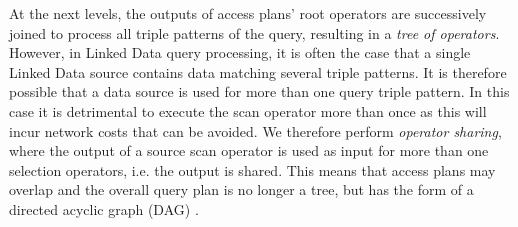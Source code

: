 At the next levels, the outputs of access plans' root operators are successively
joined to process all triple patterns of the query, resulting in a \emph{tree of operators}. However, in Linked Data query processing, it is often the case that a single
Linked Data source contains data matching several triple patterns. It
is therefore possible that a data source is used for more than one
query triple pattern. In this case it is detrimental to execute the
scan operator more than once as this will incur network costs that can
be avoided. We therefore perform \emph{operator sharing}, where the
output of a source scan operator is used as input for more than one
selection operators, i.e. the output is shared. This means that access plans may
overlap and the overall query plan is no longer a tree, but has the form of a directed
acyclic graph (DAG) \cite{Neumann_2005}. 

%  	


